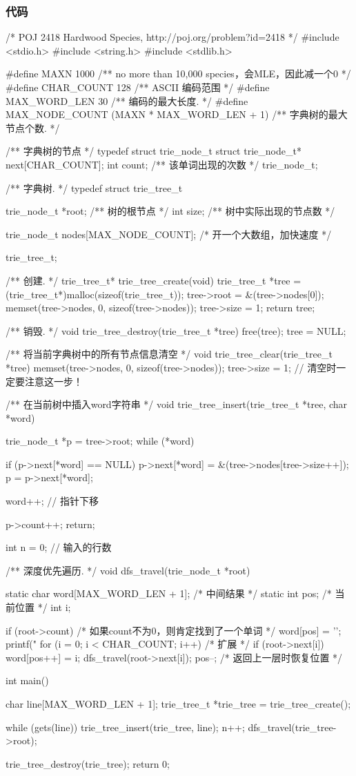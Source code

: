 \subsubsection{代码}
\begin{Codex}[label=hardwood_species.c]
/* POJ 2418 Hardwood Species, http://poj.org/problem?id=2418 */
#include <stdio.h>
#include <string.h>
#include <stdlib.h>


#define MAXN 1000   /**  no more than 10,000 species，会MLE，因此减一个0 */
#define CHAR_COUNT  128 /** ASCII 编码范围 */
#define MAX_WORD_LEN 30 /** 编码的最大长度. */
#define MAX_NODE_COUNT  (MAXN * MAX_WORD_LEN + 1)  /** 字典树的最大节点个数. */


/** 字典树的节点 */
typedef struct trie_node_t {
    struct trie_node_t* next[CHAR_COUNT];
    int count;  /** 该单词出现的次数 */
} trie_node_t;

/** 字典树. */
typedef struct trie_tree_t {
    trie_node_t *root; /** 树的根节点 */
    int size; /** 树中实际出现的节点数 */

    trie_node_t nodes[MAX_NODE_COUNT]; /* 开一个大数组，加快速度 */
} trie_tree_t;

/** 创建. */
trie_tree_t* trie_tree_create(void) {
    trie_tree_t *tree = (trie_tree_t*)malloc(sizeof(trie_tree_t));
    tree->root = &(tree->nodes[0]);
    memset(tree->nodes, 0, sizeof(tree->nodes));
    tree->size = 1;
    return tree;
}

/** 销毁. */
void trie_tree_destroy(trie_tree_t *tree) {
    free(tree);
    tree = NULL;
}

/** 将当前字典树中的所有节点信息清空 */
void trie_tree_clear(trie_tree_t *tree) {
    memset(tree->nodes, 0, sizeof(tree->nodes));
    tree->size = 1; // 清空时一定要注意这一步！
}

/** 在当前树中插入word字符串 */
void trie_tree_insert(trie_tree_t *tree, char *word) {
    trie_node_t *p = tree->root;
    while (*word) {
        if (p->next[*word] == NULL) {
            p->next[*word] = &(tree->nodes[tree->size++]);
        }
        p = p->next[*word];

        word++; // 指针下移
    }
    p->count++;
    return;
}


int n = 0;  // 输入的行数

/** 深度优先遍历. */
void dfs_travel(trie_node_t *root) {
    static char word[MAX_WORD_LEN + 1]; /* 中间结果 */
    static int pos;  /* 当前位置 */
    int i;

    if (root->count) { /* 如果count不为0，则肯定找到了一个单词 */
        word[pos] = '\0';
        printf("%
    }
    for (i = 0; i < CHAR_COUNT; i++) {  /* 扩展 */
        if (root->next[i]) {
            word[pos++] = i;
            dfs_travel(root->next[i]);
            pos--; /* 返回上一层时恢复位置 */
        }
    }
}

int main() {
    char line[MAX_WORD_LEN + 1];
    trie_tree_t *trie_tree = trie_tree_create();

    while (gets(line)) {
        trie_tree_insert(trie_tree, line);
        n++;
    }
    dfs_travel(trie_tree->root);

    trie_tree_destroy(trie_tree);
    return 0;
}
\end{Codex}


